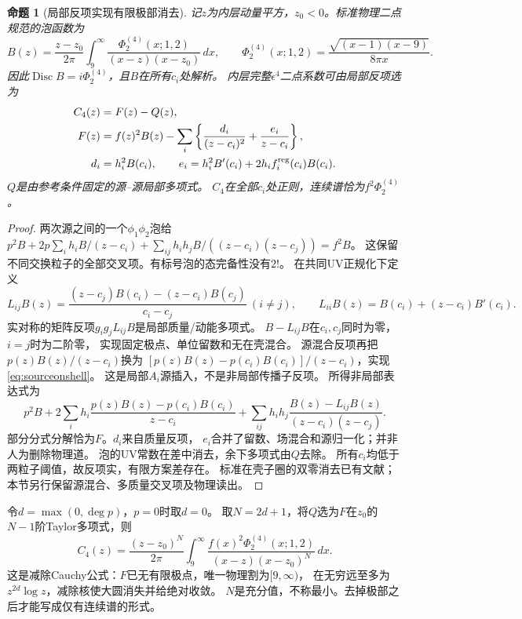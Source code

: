\documentclass[11pt,a4paper]{ctexart}
\theoremstyle{cnplain}\newtheorem{theorem}{定理}[section]
\newtheorem{proposition}[theorem]{命题}
\theoremstyle{definition}\newtheorem{definition}[theorem]{定义}
\theoremstyle{remark}\newtheorem{remark}[theorem]{注}
\begin{document}
\begin{proposition}[局部反项实现有限极部消去]\label{prop:sourceprincipal}
记$z$为内层动量平方，$z_0<0$。标准物理二点规范的泡函数为
\begin{equation}\label{eq:sourcebubble}
 B(z)=\frac{z-z_0}{2\pi}\int_9^\infty
 \frac{\Phi_2^{(4)}(x;1,2)}{(x-z)(x-z_0)}\,dx,\qquad
 \Phi_2^{(4)}(x;1,2)=\frac{\sqrt{(x-1)(x-9)}}{8\pi x}.
\end{equation}
因此$\operatorname{Disc}B=i\Phi_2^{(4)}$，且$B$在所有$c_i$处解析。
内层完整$\epsilon^4$二点系数可由局部反项选为
\begin{align}
 C_4(z)&=F(z)-Q(z),\label{eq:sourceprincipal}\\
 F(z)&=f(z)^2B(z)-
 \sum_i\left\{\frac{d_i}{(z-c_i)^2}+\frac{e_i}{z-c_i}\right\},\nonumber\\
 d_i&=h_i^2 B(c_i),\qquad
 e_i=h_i^2B'(c_i)+2h_i f_i^{\rm reg}(c_i)B(c_i).\nonumber
\end{align}
$Q$是由参考条件固定的源--源局部多项式。
$C_4$在全部$c_i$处正则，连续谱恰为$f^2\Phi_2^{(4)}$。
\end{proposition}
\begin{proof}
两次源之间的一个$\phi_1\phi_2$泡给
$p^2B+2p\sum_i h_iB/(z-c_i)+
\sum_{ij}h_i h_jB/((z-c_i)(z-c_j))=f^2B$。
这保留不同交换粒子的全部交叉项。有标号泡的态完备性没有$2!$。
在共同UV正规化下定义
\[
 L_{ij}B(z)=
 \frac{(z-c_j)B(c_i)-(z-c_i)B(c_j)}{c_i-c_j}\ (i\ne j),
 \qquad L_{ii}B(z)=B(c_i)+(z-c_i)B'(c_i).
\]
实对称的矩阵反项$g_i g_jL_{ij}B$是局部质量/动能多项式。
$B-L_{ij}B$在$c_i,c_j$同时为零，$i=j$时为二阶零，
实现固定极点、单位留数和无在壳混合。
源混合反项再把$p(z)B(z)/(z-c_i)$换为
$[p(z)B(z)-p(c_i)B(c_i)]/(z-c_i)$，实现\eqref{eq:sourceonshell}。
这是局部$A_i$源插入，不是非局部传播子反项。
所得非局部表达式为
\[
 p^2B+
 2\sum_i h_i\frac{p(z)B(z)-p(c_i)B(c_i)}{z-c_i}
 +\sum_{ij}h_i h_j
       \frac{B(z)-L_{ij}B(z)}{(z-c_i)(z-c_j)} .
\]
部分分式分解恰为$F$。$d_i$来自质量反项，
$e_i$合并了留数、场混合和源归一化；并非人为删除物理道。
泡的UV常数在差中消去，余下多项式由$Q$去除。
所有$c_i$均低于两粒子阈值，故反项实，有限方案差存在。
标准在壳子圈的双零消去已有文献\cite[式(15)]{Aleksejevs}；
本节另行保留源混合、多质量交叉项及物理读出。
\end{proof}

令$d=\max(0,\deg p)$，$p=0$时取$d=0$。
取$N=2d+1$，将$Q$选为$F$在$z_0$的$N-1$阶Taylor多项式，则
\begin{equation}\label{eq:sourceinnerdisp}
 C_4(z)=\frac{(z-z_0)^N}{2\pi}
 \int_9^\infty\frac{f(x)^2\Phi_2^{(4)}(x;1,2)}
 {(x-z)(x-z_0)^N}\,dx .
\end{equation}
这是减除Cauchy公式：$F$已无有限极点，唯一物理割为$[9,\infty)$，
在无穷远至多为$z^{2d}\log z$，减除核使大圆消失并给绝对收敛。
$N$是充分值，不称最小。去掉极部之后才能写成仅有连续谱的形式。
\end{document}
